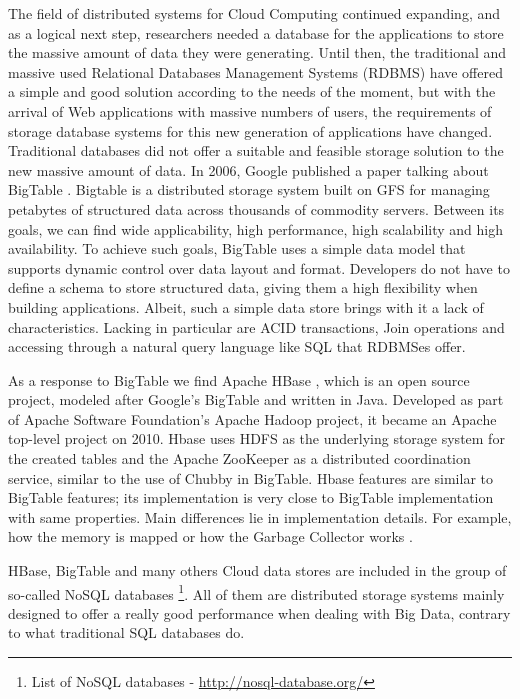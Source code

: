 The field of distributed systems for Cloud Computing continued expanding, and as a logical next step, researchers needed a database for the applications to store the massive amount of data they were generating. Until then, the traditional and massive used Relational Databases Management Systems (RDBMS) have offered a simple and good solution according to the needs of the moment, but with the arrival of Web applications with massive numbers of users, the requirements of storage database systems for this new generation of applications have changed. Traditional databases did not offer a suitable and feasible storage solution to the new massive amount of data. In 2006, Google published a paper talking about BigTable \cite{chang2008bigtable}. Bigtable is a distributed storage system built on GFS for managing petabytes of structured data across thousands of commodity servers. Between its goals, we can find wide applicability, high performance, high scalability and high availability. To achieve such goals, BigTable uses a simple data model that supports dynamic control over data layout and format. Developers do not have to define a schema to store structured data, giving them a high flexibility when building applications. Albeit, such a simple data store brings with it a lack of characteristics. Lacking in particular are ACID transactions, Join operations and accessing through a natural query language like SQL that RDBMSes offer.
\par
As a response to BigTable we find Apache HBase \cite{ApacheHBase}, which is an open source project, modeled after Google's BigTable and written in Java. Developed as part of Apache Software Foundation's Apache Hadoop project, it became an Apache top-level project on 2010. Hbase uses HDFS as the underlying storage system for the created tables and the Apache ZooKeeper as a distributed coordination service, similar to the use of Chubby \cite{burrows2006chubby} in BigTable. Hbase features are similar to BigTable features; its implementation is very close to BigTable implementation with same properties. Main differences lie in implementation details. For example, how the memory is mapped or how the Garbage Collector works \cite {samar2011scalable}.
\par
HBase, BigTable and many others Cloud data stores are included in the group of so-called NoSQL databases \footnote{List of NoSQL databases - \url{http://nosql-database.org/} }. All of them are distributed storage systems mainly designed to offer a really good performance when dealing with Big Data, contrary to what traditional SQL databases do. 

